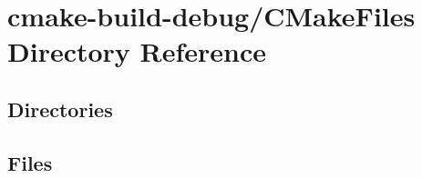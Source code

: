 \section{cmake-\/build-\/debug/\+C\+Make\+Files Directory Reference}
\label{dir_f89abcb304c928c7d889aa5625570de5}
\subsection*{Directories}
\begin{DoxyCompactItemize}
\end{DoxyCompactItemize}
\subsection*{Files}
\begin{DoxyCompactItemize}
\end{DoxyCompactItemize}
